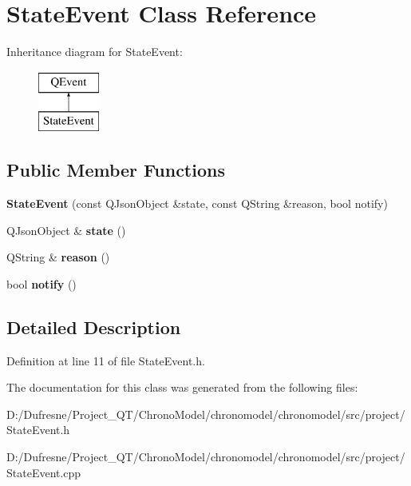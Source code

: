 \hypertarget{class_state_event}{\section{State\-Event Class Reference}
\label{class_state_event}
}
Inheritance diagram for State\-Event\-:\begin{figure}[H]
\begin{center}
\leavevmode
\includegraphics[height=2.000000cm]{class_state_event}
\end{center}
\end{figure}
\subsection*{Public Member Functions}
\begin{DoxyCompactItemize}
\item 
\hypertarget{class_state_event_aca6b74bc8dbd4999b83d94938396dda0}{{\bfseries State\-Event} (const Q\-Json\-Object \&state, const Q\-String \&reason, bool notify)}\label{class_state_event_aca6b74bc8dbd4999b83d94938396dda0}

\item 
\hypertarget{class_state_event_ab60bd509f6578f34e4233936b0e28a09}{Q\-Json\-Object \& {\bfseries state} ()}\label{class_state_event_ab60bd509f6578f34e4233936b0e28a09}

\item 
\hypertarget{class_state_event_a92fe71fb03492ee6951075558fc7d832}{Q\-String \& {\bfseries reason} ()}\label{class_state_event_a92fe71fb03492ee6951075558fc7d832}

\item 
\hypertarget{class_state_event_ad9165fb4bd1db432b506a707a00bd8a4}{bool {\bfseries notify} ()}\label{class_state_event_ad9165fb4bd1db432b506a707a00bd8a4}

\end{DoxyCompactItemize}


\subsection{Detailed Description}


Definition at line 11 of file State\-Event.\-h.



The documentation for this class was generated from the following files\-:\begin{DoxyCompactItemize}
\item 
D\-:/\-Dufresne/\-Project\-\_\-\-Q\-T/\-Chrono\-Model/chronomodel/chronomodel/src/project/State\-Event.\-h\item 
D\-:/\-Dufresne/\-Project\-\_\-\-Q\-T/\-Chrono\-Model/chronomodel/chronomodel/src/project/State\-Event.\-cpp\end{DoxyCompactItemize}
